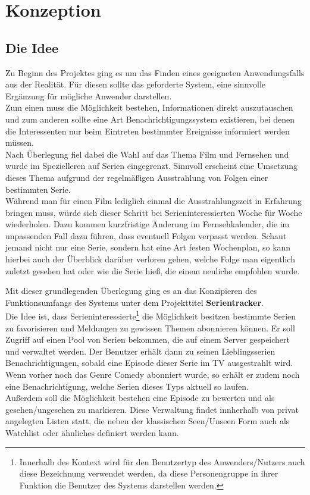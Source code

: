 
\chapter{Konzeption}

\section{Die Idee}

Zu Beginn des Projektes ging es um das Finden eines geeigneten Anwendungsfalls aus der Realität. Für diesen sollte das geforderte System, eine sinnvolle Ergänzung für mögliche Anwender darstellen.\\
Zum einen muss die Möglichkeit bestehen, Informationen direkt auszutauschen und zum anderen sollte eine Art Benachrichtigungssystem existieren, bei denen die Interessenten nur beim Eintreten bestimmter Ereignisse informiert werden müssen.\\
Nach Überlegung fiel dabei die Wahl auf das Thema Film und Fernsehen und wurde im Spezielleren auf Serien eingegrenzt. Sinnvoll erscheint eine Umsetzung dieses Thema aufgrund der regelmäßigen Ausstrahlung von Folgen einer bestimmten Serie.\\
Während man für einen Film lediglich einmal die Ausstrahlungszeit in Erfahrung bringen muss, würde sich dieser Schritt bei Serieninteressierten Woche für Woche wiederholen. Dazu kommen kurzfristige Änderung im Fernsehkalender, die im unpassenden Fall dazu führen, dass eventuell Folgen verpasst werden. Schaut jemand nicht nur eine Serie, sondern hat eine Art festen Wochenplan, so kann hierbei auch der Überblick darüber verloren gehen, welche Folge man eigentlich zuletzt gesehen hat oder wie die Serie hieß, die einem neuliche empfohlen wurde.

\vspace{0.2cm}

Mit dieser grundlegenden Überlegung ging es an das Konzipieren des Funktionsumfangs des Systems unter dem Projekttitel \textbf{Serientracker}.\\
Die Idee ist, dass Serieninteressierte\footnote[1]{Innerhalb des Kontext wird für den Benutzertyp des Anwenders/Nutzers auch diese Bezeichnung verwendet werden, da diese Personengruppe in ihrer Funktion die Benutzer des Systems darstellen werden.} die Möglichkeit besitzen bestimmte Serien zu favorisieren und Meldungen zu gewissen Themen abonnieren können. Er soll Zugriff auf einen Pool von Serien bekommen, die auf einem Server gespeichert und verwaltet werden. Der Benutzer erhält dann zu seinen Lieblingsserien Benachrichtigungen, sobald eine Episode dieser Serie im TV ausgestrahlt wird. Wenn vorher noch das Genre Comedy abonniert wurde, so erhält er zudem noch eine Benachrichtigung, welche Serien dieses Typs aktuell so laufen.\\
Außerdem soll die Möglichkeit bestehen eine Episode zu bewerten und als gesehen/ungesehen zu markieren. Diese Verwaltung findet innherhalb von privat angelegten Listen statt, die neben der klassischen Seen/Unseen Form auch als Watchlist oder ähnliches definiert werden kann.

